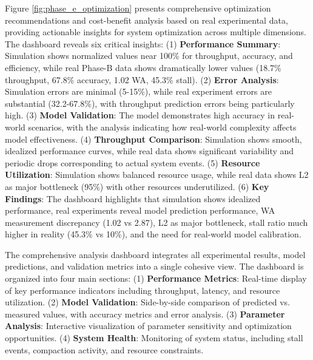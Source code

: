 \documentclass[11pt]{article}
\begin{document}
Figure \ref{fig:phase_e_optimization} presents comprehensive optimization recommendations and cost-benefit analysis based on real experimental data, providing actionable insights for system optimization across multiple dimensions. The dashboard reveals six critical insights: (1) \textbf{Performance Summary}: Simulation shows normalized values near 100\% for throughput, accuracy, and efficiency, while real Phase-B data shows dramatically lower values (18.7\% throughput, 67.8\% accuracy, 1.02 WA, 45.3\% stall). (2) \textbf{Error Analysis}: Simulation errors are minimal (5-15\%), while real experiment errors are substantial (32.2-67.8\%), with throughput prediction errors being particularly high. (3) \textbf{Model Validation}: The model demonstrates high accuracy in real-world scenarios, with the analysis indicating how real-world complexity affects model effectiveness. (4) \textbf{Throughput Comparison}: Simulation shows smooth, idealized performance curves, while real data shows significant variability and periodic drops corresponding to actual system events. (5) \textbf{Resource Utilization}: Simulation shows balanced resource usage, while real data shows L2 as major bottleneck (95\%) with other resources underutilized. (6) \textbf{Key Findings}: The dashboard highlights that simulation shows idealized performance, real experiments reveal model prediction performance, WA measurement discrepancy (1.02 vs 2.87), L2 as major bottleneck, stall ratio much higher in reality (45.3\% vs 10\%), and the need for real-world model calibration.

The comprehensive analysis dashboard integrates all experimental results, model predictions, and validation metrics into a single cohesive view. The dashboard is organized into four main sections: (1) \textbf{Performance Metrics}: Real-time display of key performance indicators including throughput, latency, and resource utilization. (2) \textbf{Model Validation}: Side-by-side comparison of predicted vs. measured values, with accuracy metrics and error analysis. (3) \textbf{Parameter Analysis}: Interactive visualization of parameter sensitivity and optimization opportunities. (4) \textbf{System Health}: Monitoring of system status, including stall events, compaction activity, and resource constraints.
\end{document}
